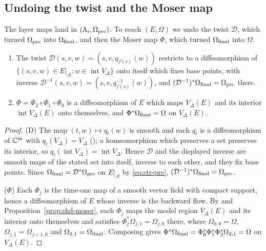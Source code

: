 \subsection{Undoing the twist and the Moser map}\label{sec:str-embeddings}

The layer maps land in $(\Lambda_i,\Omega_{\rm pre})$. To reach $(E,\Omega)$ we undo the twist $\mathcal D$, which turned
$\Omega_{\rm pre}$ into $\Omega_{\rm final}$, and then the Moser map $\Phi$, which turned $\Omega_{\rm final}$ into $\Omega$.

\begin{lemma}\label{lem:str-DPhi}
\begin{enumerate}[label=(\roman*)]
\item[(D)] The twist $\mathcal D(s,v,w)=(s,v,q_{f(s)}(w))$ restricts to a diffeomorphism of
$\{(s,v,w)\in E|_{\mathcal A}:w\in\operatorname{int}V_\Delta\}$ onto itself which fixes base points, with inverse
$\mathcal D^{-1}(s,v,w)=(s,v,q_{f(s)}^{-1}(w))$, and $(\mathcal D^{-1})^*\Omega_{\rm final}=\Omega_{\rm pre}$ there.
\item[($\Phi$)] $\Phi=\Phi_2\circ\Phi_1\circ\Phi_0$ is a diffeomorphism of $E$ which maps $V_\Delta(E)$ and its interior
$\operatorname{int}V_\Delta(E)$ onto themselves, and $\Phi^*\Omega_{\rm final}=\Omega$ on $V_\Delta(E)$.
\end{enumerate}
\end{lemma}

\begin{proof}
(D) The map $(t,w)\mapsto q_t(w)$ is smooth and each $q_t$ is a diffeomorphism of $\mathbb{C}^m$ with $q_t(V_\Delta)=V_\Delta$
(); a homeomorphism which preserves a set preserves its interior, so
$q_t(\operatorname{int}V_\Delta)=\operatorname{int}V_\Delta$. Hence $\mathcal D$ and the displayed inverse are smooth maps of the
stated set into itself, inverse to each other, and they fix base points. Since $\Omega_{\rm final}=\mathcal D^*\Omega_{\rm pre}$ on
$E|_{\mathcal A}$ by \eqref{eq:str-pre}, $(\mathcal D^{-1})^*\Omega_{\rm final}=\Omega_{\rm pre}$.

($\Phi$) Each $\Phi_j$ is the time-one map of a smooth vector field with compact support, hence a diffeomorphism of $E$ whose
inverse is the backward flow. By  and Proposition~\ref{prop:shd-moser}, each $\Phi_j$ maps the
model region $V_\Delta(E)$ and its interior onto themselves and satisfies $\Phi_j^*\Omega_{j,1}=\Omega_{j,0}$ there, where
$\Omega_{0,0}=\Omega$, $\Omega_{j,1}=\Omega_{j+1,0}$ and $\Omega_{2,1}=\Omega_{\rm final}$. Composing gives
$\Phi^*\Omega_{\rm final}=\Phi_0^*\Phi_1^*\Phi_2^*\Omega_{2,1}=\Omega$ on $V_\Delta(E)$.
\end{proof}

